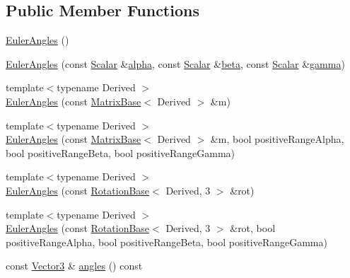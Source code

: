 \subsection*{Public Member Functions}
\begin{DoxyCompactItemize}
\item 
\hyperlink{class_eigen_1_1_euler_angles_a47be9344fbd4a5b34df45486cfaf1e2b}{Euler\+Angles} ()
\item 
\hyperlink{class_eigen_1_1_euler_angles_a765135b6e5d35248517b4268046840b6}{Euler\+Angles} (const \hyperlink{class_eigen_1_1_euler_angles_a2ab1d433ac9683268446f8905ac31aac}{Scalar} \&\hyperlink{class_eigen_1_1_euler_angles_a6146f78ee0fb9d9a7d685a4654066825}{alpha}, const \hyperlink{class_eigen_1_1_euler_angles_a2ab1d433ac9683268446f8905ac31aac}{Scalar} \&\hyperlink{class_eigen_1_1_euler_angles_a1bf59f8acaed985964c98c1f59d8f5ab}{beta}, const \hyperlink{class_eigen_1_1_euler_angles_a2ab1d433ac9683268446f8905ac31aac}{Scalar} \&\hyperlink{class_eigen_1_1_euler_angles_aa75a5f16105d96eedf81bf9f8e789e21}{gamma})
\item 
{\footnotesize template$<$typename Derived $>$ }\\\hyperlink{class_eigen_1_1_euler_angles_ae2f34ff915892795d3d304c5dd0eec42}{Euler\+Angles} (const \hyperlink{group___core___module_class_eigen_1_1_matrix_base}{Matrix\+Base}$<$ Derived $>$ \&m)
\item 
{\footnotesize template$<$typename Derived $>$ }\\\hyperlink{class_eigen_1_1_euler_angles_ab545bb022c56b1b93463c308f1bcc489}{Euler\+Angles} (const \hyperlink{group___core___module_class_eigen_1_1_matrix_base}{Matrix\+Base}$<$ Derived $>$ \&m, bool positive\+Range\+Alpha, bool positive\+Range\+Beta, bool positive\+Range\+Gamma)
\item 
{\footnotesize template$<$typename Derived $>$ }\\\hyperlink{class_eigen_1_1_euler_angles_a22539c574d7b6ca4577691f533f60061}{Euler\+Angles} (const \hyperlink{class_eigen_1_1_rotation_base}{Rotation\+Base}$<$ Derived, 3 $>$ \&rot)
\item 
{\footnotesize template$<$typename Derived $>$ }\\\hyperlink{class_eigen_1_1_euler_angles_aeaf9524ff49ee720786e78f44c23cc17}{Euler\+Angles} (const \hyperlink{class_eigen_1_1_rotation_base}{Rotation\+Base}$<$ Derived, 3 $>$ \&rot, bool positive\+Range\+Alpha, bool positive\+Range\+Beta, bool positive\+Range\+Gamma)
\item 
const \hyperlink{class_eigen_1_1_euler_angles_af0f446aa0f46b3439abedff63fabf39c}{Vector3} \& \hyperlink{class_eigen_1_1_euler_angles_a2decf84b5efd265f7251fd32f539a36b}{angles} () const

\end{DoxyCompactItemize}
